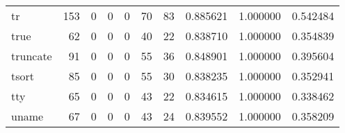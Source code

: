 \begin{tabular}{lrrrrrrrrr}
tr        &                                   153 &                                                  0 &                                                  0 &                                                  0 &                                                 70 &                                                 83 &                                           0.885621 &                               1.000000 &                             0.542484 \\
true      &                                    62 &                                                  0 &                                                  0 &                                                  0 &                                                 40 &                                                 22 &                                           0.838710 &                               1.000000 &                             0.354839 \\
truncate  &                                    91 &                                                  0 &                                                  0 &                                                  0 &                                                 55 &                                                 36 &                                           0.848901 &                               1.000000 &                             0.395604 \\
tsort     &                                    85 &                                                  0 &                                                  0 &                                                  0 &                                                 55 &                                                 30 &                                           0.838235 &                               1.000000 &                             0.352941 \\
tty       &                                    65 &                                                  0 &                                                  0 &                                                  0 &                                                 43 &                                                 22 &                                           0.834615 &                               1.000000 &                             0.338462 \\
uname     &                                    67 &                                                  0 &                                                  0 &                                                  0 &                                                 43 &                                                 24 &                                           0.839552 &                               1.000000 &                             0.358209 \\

\end{tabular}
